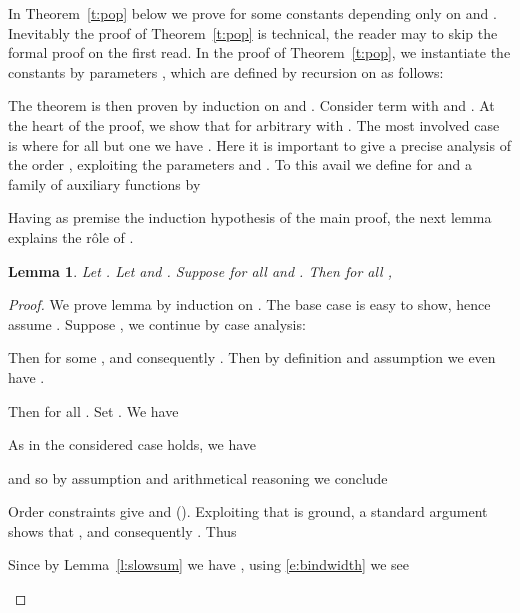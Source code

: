\documentclass{LMCS}
\newtheorem{lemma}[thm]{Lemma}
\begin{document}
In Theorem~\ref{t:pop} below we prove 
for some constants  depending only on  and . 
Inevitably the proof of Theorem~\ref{t:pop} is technical, 
the reader may to skip the formal proof on the first read.
In the proof of Theorem~\ref{t:pop}, we instantiate the constants  by parameters , 
which are defined by recursion on  as follows:\label{d:dkp:ckp}

The theorem is then proven by induction on  and .
Consider term  with  and .
At the heart of the proof, we show that 
 for arbitrary  with . 
The most involved case is  where for all 
but one  we have . 
Here it is important to give a precise analysis of the order , 
exploiting the parameters  and . 
To this avail we define for  and  a family of auxiliary functions 
 by

Having as premise the induction hypothesis of the main proof, the next lemma 
explains the r\^ole of .
\begin{lemma}\label{l:pop:aux}
  Let .
  Let  and 
  .
  Suppose  for all  and .
  Then for all , 
  
\end{lemma}
\begin{proof}

  We prove lemma by induction on .
  The base case  is easy to show, hence 
  assume . 
  Suppose , we continue by case analysis:
  \begin{description}[leftmargin=0.3cm]
  \item[\dcase{}] 
  Then  for some ,
  and consequently . 
  Then by definition and assumption we even have .

  \item[\dcase{ where ] 
    Then 
     for all .
    Set . We have
    
    As in the considered case  holds, we have
     
    and so by assumption and arithmetical reasoning we conclude
    
  \item[\dcase{ where ]
    Order constraints give 
    and  ().
    Exploiting that  is ground, a standard argument shows 
    that , and consequently 
    .
    Thus
    
    Since by Lemma~\ref{l:slowsum} we have , 
    using \eqref{e:bindwidth} we see
    
  \end{description}
\end{proof}
\end{document}

